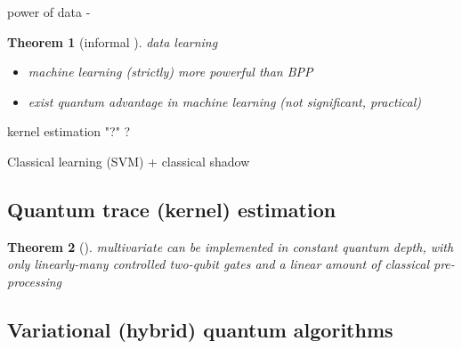 \documentclass[
10pt,
aps,
pra,
linenumbers,
floatfix,
]{revtex4-2}
\theoremstyle{plain}
\newtheorem{theorem}{Theorem}
\theoremstyle{definition}
\newtheorem{definition}{Definition}
\begin{document}
power of data - 
\begin{theorem}[informal \cite{huangPowerDataQuantum2021}]
	data learning
	\begin{itemize}
		\item machine learning (strictly) more powerful than BPP
		\item exist quantum advantage in machine learning (not significant, practical)
	\end{itemize}
\end{theorem}
\begin{algorithm}[H]
    \DontPrintSemicolon
    \BlankLine
     {
        kernel estimation 
    {\Return "?"}
    }
    \Return ?
    \caption{Classical learning (SVM) + classical shadow}
    \label{alg:classical_learning}
\end{algorithm}

\subsection{Quantum trace (kernel) estimation}
\begin{theorem}[\cite{quekMultivariateTraceEstimation2022}]
	multivariate  can be implemented in constant quantum depth, with only linearly-many controlled two-qubit gates and a linear amount of classical pre-processing	
\end{theorem}

\subsection{Variational (hybrid) quantum algorithms}
\end{document}
